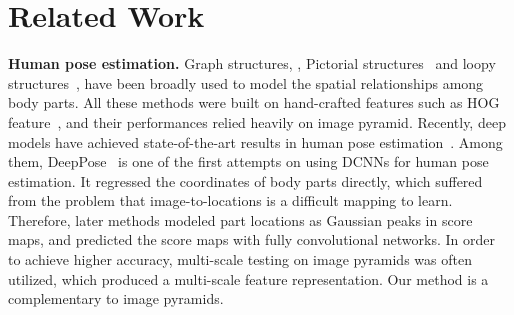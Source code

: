 \documentclass[10pt,twocolumn,letterpaper]{article}
\newcommand{\smalltitle}[1]{\vspace{0.2em}\noindent \textbf{{#1}}}
\begin{document}
\section{Related Work}
\smalltitle{Human pose estimation. }
Graph structures, \eg, Pictorial structures~\cite{fischler1973representation,felzenszwalb2005pictorial,yang2011articulated} and loopy structures~\cite{ren2005recovering,tian2010fast,ferrari20092d}, have been broadly used to model the spatial relationships among body parts. 
All these methods were built on hand-crafted features such as HOG feature~\cite{dalal2005histograms}, and their performances relied heavily on image pyramid. 
Recently, deep models have achieved state-of-the-art results in human pose estimation~\cite{belagiannis2016recurrent,insafutdinov2016deepercut,bulat2016human,wei2016convolutional,newell2016stacked,chu2016structure,yang2016end,chu2017multi,cao2017realtime,papandreou2017towards}. 
Among them, DeepPose~\cite{toshev2014deeppose} is one of the first attempts on using DCNNs for human pose estimation. 								 
It regressed the coordinates of body parts directly, which suffered from the problem that image-to-locations is a difficult mapping to learn. 
Therefore, later methods modeled part locations as Gaussian peaks in score maps, and predicted the score maps with fully convolutional networks. 
In order to achieve higher accuracy, multi-scale testing on image pyramids was often utilized, which produced a multi-scale feature representation. 
Our method is a complementary to image pyramids.
																							 
\end{document}
